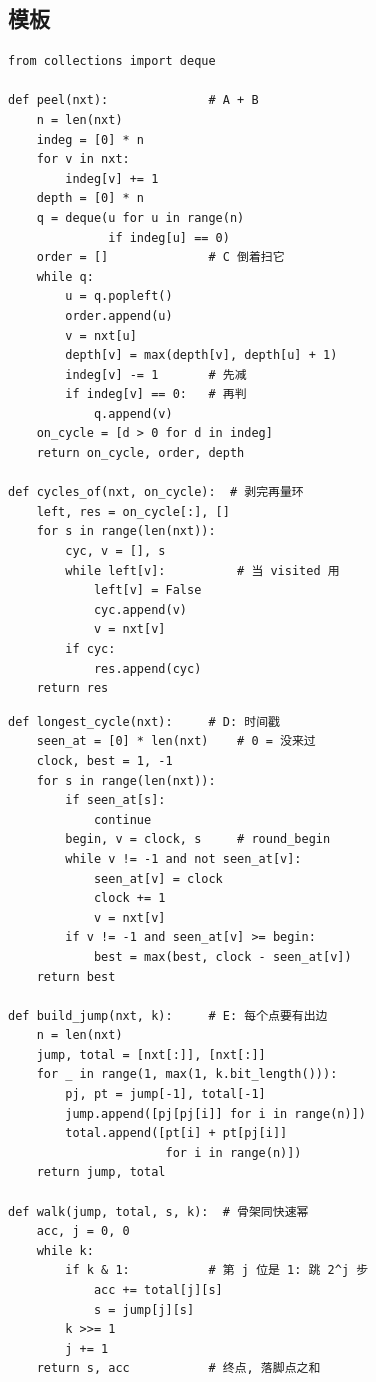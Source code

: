 \subsection{模板}

\begin{minipage}[t]{0.49\linewidth}
\begin{lstlisting}
from collections import deque

def peel(nxt):              # A + B
    n = len(nxt)
    indeg = [0] * n
    for v in nxt:
        indeg[v] += 1
    depth = [0] * n
    q = deque(u for u in range(n)
              if indeg[u] == 0)
    order = []              # C 倒着扫它
    while q:
        u = q.popleft()
        order.append(u)
        v = nxt[u]
        depth[v] = max(depth[v], depth[u] + 1)
        indeg[v] -= 1       # 先减
        if indeg[v] == 0:   # 再判
            q.append(v)
    on_cycle = [d > 0 for d in indeg]
    return on_cycle, order, depth

def cycles_of(nxt, on_cycle):  # 剥完再量环
    left, res = on_cycle[:], []
    for s in range(len(nxt)):
        cyc, v = [], s
        while left[v]:          # 当 visited 用
            left[v] = False
            cyc.append(v)
            v = nxt[v]
        if cyc:
            res.append(cyc)
    return res
\end{lstlisting}
\end{minipage}\hfill
\begin{minipage}[t]{0.49\linewidth}
\begin{lstlisting}
def longest_cycle(nxt):     # D: 时间戳
    seen_at = [0] * len(nxt)    # 0 = 没来过
    clock, best = 1, -1
    for s in range(len(nxt)):
        if seen_at[s]:
            continue
        begin, v = clock, s     # round_begin
        while v != -1 and not seen_at[v]:
            seen_at[v] = clock
            clock += 1
            v = nxt[v]
        if v != -1 and seen_at[v] >= begin:
            best = max(best, clock - seen_at[v])
    return best

def build_jump(nxt, k):     # E: 每个点要有出边
    n = len(nxt)
    jump, total = [nxt[:]], [nxt[:]]
    for _ in range(1, max(1, k.bit_length())):
        pj, pt = jump[-1], total[-1]
        jump.append([pj[pj[i]] for i in range(n)])
        total.append([pt[i] + pt[pj[i]]
                      for i in range(n)])
    return jump, total

def walk(jump, total, s, k):  # 骨架同快速幂
    acc, j = 0, 0
    while k:
        if k & 1:           # 第 j 位是 1: 跳 2^j 步
            acc += total[j][s]
            s = jump[j][s]
        k >>= 1
        j += 1
    return s, acc           # 终点, 落脚点之和
\end{lstlisting}
\end{minipage}

